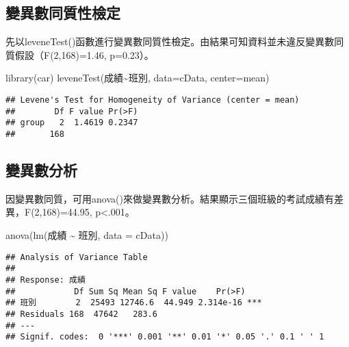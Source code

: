 \documentclass[
]{book}
\newenvironment{Shaded}{\begin{snugshade}}{\end{snugshade}}
\newcommand{\AttributeTok}[1]{\textcolor[rgb]{0.77,0.63,0.00}{#1}}
\newcommand{\FunctionTok}[1]{\textcolor[rgb]{0.00,0.00,0.00}{#1}}
\newcommand{\NormalTok}[1]{#1}
\newcommand{\SpecialCharTok}[1]{\textcolor[rgb]{0.00,0.00,0.00}{#1}}
\begin{document}
\hypertarget{ux8b8aux7570ux6578ux540cux8ceaux6027ux6aa2ux5b9a}{%
\subsection{變異數同質性檢定}\label{ux8b8aux7570ux6578ux540cux8ceaux6027ux6aa2ux5b9a}}

先以leveneTest()函數進行變異數同質性檢定。由結果可知資料並未違反變異數同質假設（F(2,168)=1.46, p=0.23）。

\begin{Shaded}
\begin{Highlighting}[]
\FunctionTok{library}\NormalTok{(car)}
\FunctionTok{leveneTest}\NormalTok{(成績}\SpecialCharTok{\textasciitilde{}}\NormalTok{班別, }\AttributeTok{data=}\NormalTok{cData, }\AttributeTok{center=}\NormalTok{mean)}
\end{Highlighting}
\end{Shaded}

\begin{verbatim}
## Levene's Test for Homogeneity of Variance (center = mean)
##        Df F value Pr(>F)
## group   2  1.4619 0.2347
##       168
\end{verbatim}

\hypertarget{ux8b8aux7570ux6578ux5206ux6790-1}{%
\subsection{變異數分析}\label{ux8b8aux7570ux6578ux5206ux6790-1}}

因變異數同質，可用anova()來做變異數分析。結果顯示三個班級的考試成績有差異，F(2,168)=44.95, p\textless.001。

\begin{Shaded}
\begin{Highlighting}[]
\FunctionTok{anova}\NormalTok{(}\FunctionTok{lm}\NormalTok{(成績 }\SpecialCharTok{\textasciitilde{}}\NormalTok{ 班別, }\AttributeTok{data =}\NormalTok{ cData))}
\end{Highlighting}
\end{Shaded}

\begin{verbatim}
## Analysis of Variance Table
## 
## Response: 成績
##            Df Sum Sq Mean Sq F value    Pr(>F)    
## 班別        2  25493 12746.6  44.949 2.314e-16 ***
## Residuals 168  47642   283.6                      
## ---
## Signif. codes:  0 '***' 0.001 '**' 0.01 '*' 0.05 '.' 0.1 ' ' 1
\end{verbatim}
\end{document}
